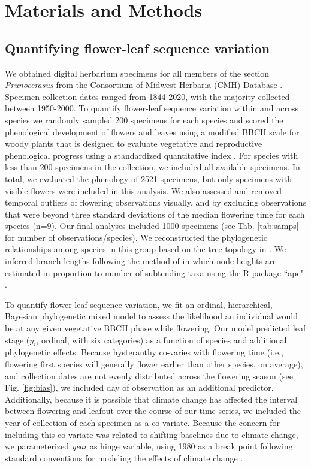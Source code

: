\documentclass{article}[12pt]
\begin{document}
\section*{Materials and Methods}
\subsection*{Quantifying flower-leaf sequence variation}  

We obtained digital herbarium specimens for all members of the section \textit{Prunocerasus} from the Consortium of Midwest Herbaria (CMH) Database \citep{CMH}. Specimen collection dates ranged from 1844-2020, with the majority collected between 1950-2000. To quantify flower-leaf sequence variation within and across species we randomly sampled 200 specimens for each species and scored the phenological development of flowers and leaves using a modified BBCH scale for woody plants that is designed to evaluate vegetative and reproductive phenological progress using a standardized quantitative index \citep{Finn2007}. For species with less than 200 specimens in the collection, we included all available specimens. In total, we evaluated the phenology of 2521 specimens, but only specimens with visible flowers were included in this analysis. We also assessed and removed  temporal outliers of flowering observations visually, and by excluding observations that were beyond three standard deviations of the median flowering time for each species (n=9). Our final analyses included 1000 specimens (see Tab. \ref{tab:samps} for number of observations/species). We reconstructed the phylogenetic relationships among species in this group based on the tree topology in \citet{Shaw:2004aa}. We inferred branch lengths following the method of \citet{Granfen1989} in which node heights are estimated in proportion to number of subtending taxa using the R package ``ape" \citep{Paradis2019}.

To quantify flower-leaf sequence variation, we fit an ordinal, hierarchical, Bayesian phylogenetic mixed model \citep{Garamszegi2014} to assess the likelihood an individual would be at any given vegetative BBCH phase while flowering. Our model predicted leaf stage ($y_i$, ordinal, with six categories) as a function of species and additional phylogenetic effects. Because hysteranthy co-varies with flowering time (i.e., flowering first species will generally flower earlier than other species, on average), and collection dates are not evenly distributed across the flowering season (see Fig. \ref{fig:bias}), we included day of observation as an additional predictor. Additionally, because it is possible that climate change has affected the interval between flowering and leafout over the course of our time series, we included the year of collection of each specimen as a co-variate. Because the concern for including this co-variate was related to shifting baselines due to climate change, we parameterized \emph{year} as hinge variable, using 1980 as a break point following standard conventions for modeling the effects of climate change \citep{IPCC2013,Buonaiuto2020,Kharouba2018}.
\end{document}
